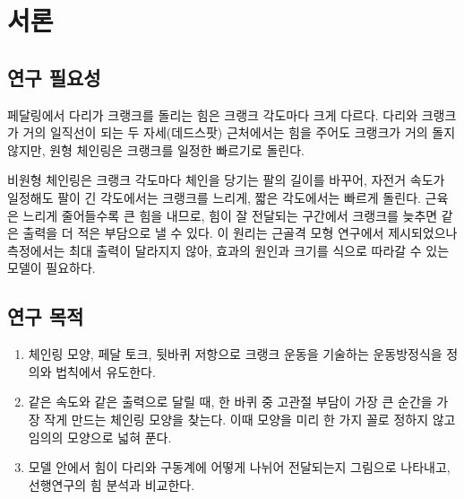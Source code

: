 \section{서론}

\subsection{연구 필요성}
페달링에서 다리가 크랭크를 돌리는 힘은 크랭크 각도마다 크게 다르다. 다리와 크랭크가 거의 일직선이 되는 두 자세(데드스팟) 근처에서는 힘을 주어도 크랭크가 거의 돌지 않지만, 원형 체인링은 크랭크를 일정한 빠르기로 돌린다.

비원형 체인링은 크랭크 각도마다 체인을 당기는 팔의 길이를 바꾸어, 자전거 속도가 일정해도 팔이 긴 각도에서는 크랭크를 느리게, 짧은 각도에서는 빠르게 돌린다. 근육은 느리게 줄어들수록 큰 힘을 내므로, 힘이 잘 전달되는 구간에서 크랭크를 늦추면 같은 출력을 더 적은 부담으로 낼 수 있다. 이 원리는 근골격 모형 연구에서 제시되었으나\cite{rankin2008} 측정에서는 최대 출력이 달라지지 않아\cite{leong2017}, 효과의 원인과 크기를 식으로 따라갈 수 있는 모델이 필요하다.

\subsection{연구 목적}
\begin{enumerate}
\item 체인링 모양, 페달 토크, 뒷바퀴 저항으로 크랭크 운동을 기술하는 운동방정식을 정의와 법칙에서 유도한다.
\item 같은 속도와 같은 출력으로 달릴 때, 한 바퀴 중 고관절 부담이 가장 큰 순간을 가장 작게 만드는 체인링 모양을 찾는다. 이때 모양을 미리 한 가지 꼴로 정하지 않고 임의의 모양으로 넓혀 푼다.
\item 모델 안에서 힘이 다리와 구동계에 어떻게 나뉘어 전달되는지 그림으로 나타내고, 선행연구의 힘 분석과 비교한다.
\end{enumerate}
